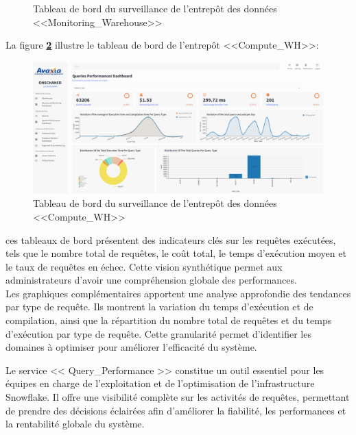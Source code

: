 \begin{itemize}
\begin{enumerate}
\begin{figure}[H]
                        \caption{Tableau de bord du surveillance de l'entrepôt des données <<Monitoring\_Warehouse>> }
                            \label{fig:queriesdash1}
                    \end{figure}
                    \par La figure \textbf{\ref{fig:queriesdash2}} illustre le tableau de bord de l'entrepôt <<Compute\_WH>>:
                    \begin{figure}[H]
                        \centering
                        \includegraphics[width =1\linewidth]{img/captures/queries/compute_dash.png}
                        \caption{Tableau de bord du surveillance de l'entrepôt des données <<Compute\_WH>>}
                            \label{fig:queriesdash2}
                    \end{figure}
                    \par ces tableaux de bord présentent des indicateurs clés sur les requêtes exécutées, tels que le nombre total de requêtes, le coût total, le temps d'exécution moyen et le taux de requêtes en échec. Cette vision synthétique permet aux administrateurs d'avoir une compréhension globale des performances.
                    \\ Les graphiques complémentaires apportent une analyse approfondie des tendances par type de requête. Ils montrent la variation du temps d'exécution et de compilation, ainsi que la répartition du nombre total de requêtes et du temps d'exécution par type de requête. Cette granularité permet d'identifier les domaines à optimiser pour améliorer l'efficacité du système.
            \end{enumerate}

\end{itemize}
\par Le service  << Query\_Performance >> constitue un outil essentiel pour les équipes en charge de l'exploitation et de l'optimisation de l'infrastructure Snowflake. Il offre une visibilité complète sur les activités de requêtes, permettant de prendre des décisions éclairées afin d'améliorer la fiabilité, les performances et la rentabilité globale du système.
